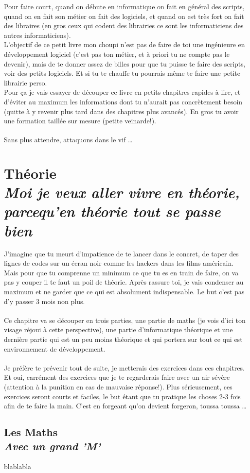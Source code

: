 \documentclass[a4paper, 11pt, oneside, draft]{book}
\newcommand\Chapter[2]{
	\chapter[#1]{#1\\[2ex]\Large\itshape#2}
}
\newcommand\Section[2]{
	\section[#1]{#1\\[1ex]\large\itshape#2}
}
\begin{document}
\vspace{5mm}
Pour faire court, quand on d\'ebute en informatique on fait en g\'en\'eral des scripts, quand on en fait son m\'etier on fait des logiciels, et quand on est tr\`es fort on fait des libraires (en gros ceux qui codent des librairies ce sont les informaticiens des autres informaticiens).\\
L'objectif de ce petit livre mon choupi n'est pas de faire de toi une ing\'enieure en d\'eveloppement logiciel (c'est pas ton m\'etier, et \`a priori tu ne compte pas le devenir), mais de te donner assez de billes pour que tu puisse te faire des scripts, voir des petits logiciels. Et si tu te chauffe tu pourrais m\^eme te faire une petite librairie perso.\\
Pour \c ca je vais essayer de d\'ecouper ce livre en petits chapitres rapides \`a lire, et d'\'eviter au maximum les informations dont tu n'aurait pas concr\`etement besoin (quitte \`a y revenir plus tard dans des chapitres plus avanc\'es). En gros tu avoir une formation taill\'ee sur mesure (petite veinarde!).\\
\\
Sans plus attendre, attaquons dans le vif \dots

\mainmatter

\Chapter{Th\'eorie}{Moi je veux aller vivre en th\'eorie, parcequ'en th\'eorie tout se passe bien}
J'imagine que tu meurt d'impatience de te lancer dans le concret, de taper des lignes de codes sur un \'ecran noir comme les hackers dans les films am\'ericain.
Mais pour que tu comprenne un minimum ce que tu es en train de faire, on va pas y couper il te faut un poil de th\'eorie.
Apr\`es rassure toi, je vais condenser au maximum et ne garder que ce qui est absolument indispensable. Le but c'est pas d'y passer 3 mois non plus.\\
\\
Ce chapitre va se d\'ecouper en trois parties, une partie de maths (je vois d'ici ton visage r\'ejoui \`a cette perspective), une partie
d'informatique th\'eorique et une derni\`ere partie qui est un peu moins th\'eorique et qui portera sur tout ce qui est environnement
de d\'eveloppement.\\
\\
Je pr\'ef\`ere te pr\'evenir tout de suite, je metterais des exercices dans ces chapitres. Et oui, carr\'ement des exercices que je te regarderais
faire avec un air s\'ev\`ere (attention \`a la punition en cas de mauvaise r\'eponse!). Plus s\'erieusement, ces exercices seront courts
et faciles, le but \'etant que tu pratique les choses 2-3 fois afin de te faire la main. C'est en forgeant qu'on devient forgeron, toussa toussa \dots
\newpage
\Section{Les Maths}{Avec un grand 'M'}
blablabla

\backmatter

\tableofcontents
\end{document}
